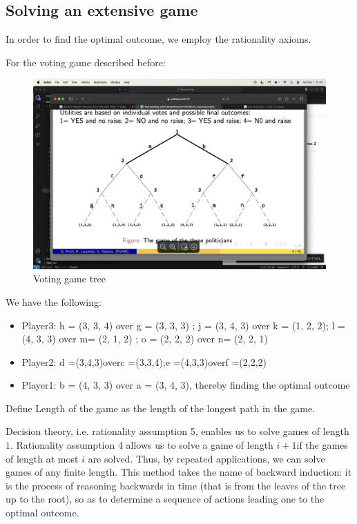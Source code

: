 \subsection{Solving an extensive game}
In order to find the optimal outcome, we employ the rationality axioms. 
\begin{example}
    For the voting game described before: 
    \begin{figure}[H]
        \centering
        \includegraphics[width=0.75\linewidth]{images/tree.png}
        \caption{Voting game tree}
    \end{figure}
    We have the following: 
    \begin{itemize}
        \item Player3: h = (3, 3, 4) over g = (3, 3, 3) ; j = (3, 4, 3) over k = (1, 2, 2); l = (4, 3, 3) over m= (2, 1, 2) ; o = (2, 2, 2) over n= (2, 2, 1)
        \item Player2: d =(3,4,3)overc =(3,3,4);e =(4,3,3)overf =(2,2,2) 
        \item Player1: b = (4, 3, 3) over a = (3, 4, 3), thereby finding the optimal outcome
    \end{itemize}
\end{example}
\begin{definition}
    Define Length of the game as the length of the longest path in the game.
\end{definition}
Decision theory, i.e. rationality assumption 5, enables us to solve games of length $1$. 
Rationality assumption 4 allows us to solve a game of length $i + 1 $if the games of length at most $i$ are solved.
Thus, by repeated applications, we can solve games of any finite length.
This method takes the name of backward induction: it is the process of reasoning backwards in time (that is from the leaves of the tree up to the root), so as to determine a sequence of actions leading one to the optimal outcome.

